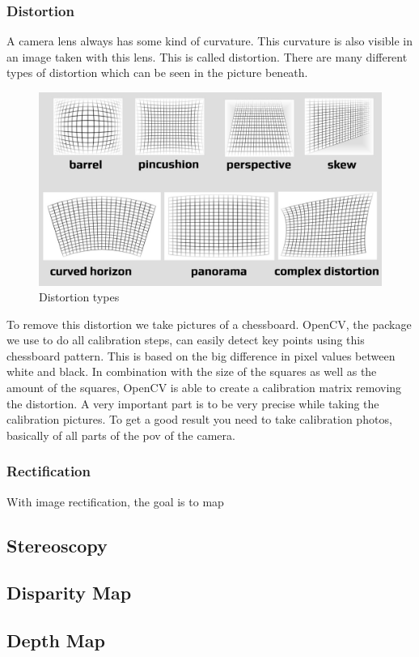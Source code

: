 \documentclass[]{IEEEphot}
\begin{document}
	\subsubsection{Distortion}
	A camera lens always has some kind of curvature. This curvature is also visible in an image taken with this lens. This is called distortion. There are many different types of distortion which can be seen in the picture beneath.
	\begin{figure}[h!]
		\centering
		\includegraphics[scale=0.3]{distortion.jpg}
		\caption{Distortion types}
	\end{figure}
	To remove this distortion we take pictures of a chessboard. OpenCV, the package we use to do all calibration steps, can easily detect key points using this chessboard pattern. This is based on the big difference in pixel values between white and black. In combination with the size of the squares as well as the amount of the squares, OpenCV is able to create a calibration matrix removing the distortion.\newline
	A very important part is to be very precise while taking the calibration pictures. To get a good result you need to take calibration photos, basically of all parts of the pov of the camera.
	\subsubsection{Rectification}
	With image rectification, the goal is to map
	\subsection{Stereoscopy}
	\subsection{Disparity Map}
	\subsection{Depth Map}
\end{document}
